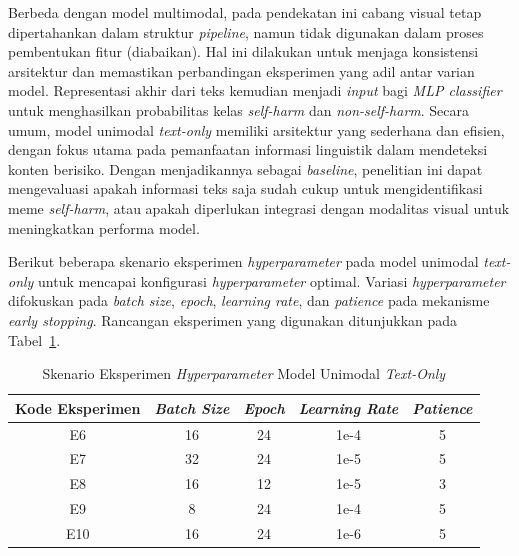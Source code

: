 Berbeda dengan model multimodal, pada pendekatan ini cabang visual tetap dipertahankan dalam struktur \textit{pipeline}, namun tidak digunakan dalam proses pembentukan fitur (diabaikan). Hal ini dilakukan untuk menjaga konsistensi arsitektur dan memastikan perbandingan eksperimen yang adil antar varian model. Representasi akhir dari teks kemudian menjadi \textit{input} bagi \textit{MLP classifier} untuk menghasilkan probabilitas kelas \textit{self-harm} dan \textit{non-self-harm}. Secara umum, model unimodal \textit{ text-only} memiliki arsitektur yang sederhana dan efisien, dengan fokus utama pada pemanfaatan informasi linguistik dalam mendeteksi konten berisiko. Dengan menjadikannya sebagai \textit{baseline}, penelitian ini dapat mengevaluasi apakah informasi teks saja sudah cukup untuk mengidentifikasi meme \textit{self-harm}, atau apakah diperlukan integrasi dengan modalitas visual untuk meningkatkan performa model.

Berikut beberapa skenario eksperimen \textit{hyperparameter} pada model unimodal \textit{ text-only} untuk mencapai konfigurasi \textit{hyperparameter} optimal. Variasi \textit{hyperparameter} difokuskan pada \textit{batch size}, \textit{epoch}, \textit{learning rate}, dan \textit{patience} pada mekanisme \textit{early stopping}. Rancangan eksperimen yang digunakan ditunjukkan pada Tabel~\ref{tabel:skenario_hyperparameter_unimodal_text_only}.

\begin{table}[H]
    \centering
    \caption{Skenario Eksperimen \textit{Hyperparameter} Model Unimodal \textit{ Text-Only}}
    \label{tabel:skenario_hyperparameter_unimodal_text_only}
    \small
    \setlength{\tabcolsep}{8pt}
    \renewcommand{\arraystretch}{1.1}
    \begin{tabular}{c c c c c}
        \hline
        \textbf{Kode Eksperimen} & \textbf{\textit{Batch Size}} & \textbf{\textit{Epoch}} & \textbf{\textit{Learning Rate}} & \textbf{\textit{Patience}} \\
        \hline
        E6 & 16 & 24 & 1e-4 & 5 \\
        E7 & 32 & 24 & 1e-5 & 5 \\
        E8 & 16 & 12 & 1e-5 & 3 \\
        E9 & 8 & 24 & 1e-4 & 5 \\
        E10 & 16 & 24 & 1e-6 & 5 \\
        \hline
    \end{tabular}
\end{table}


